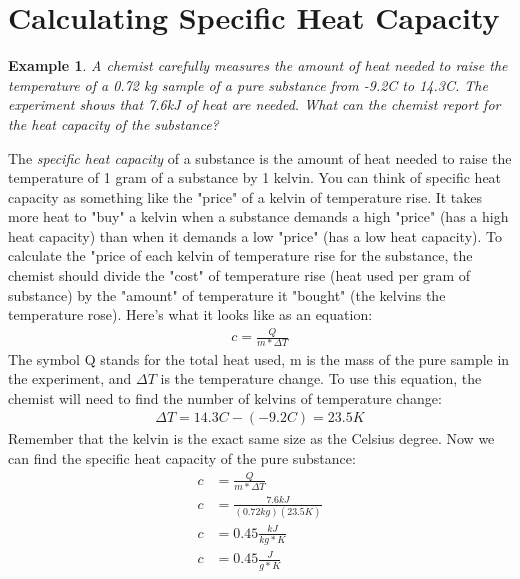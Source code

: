 \documentclass{article}  %
\newtheorem{exmp}{Example}
\begin{document}
\section*{Calculating Specific Heat Capacity}
\begin{exmp}
    A chemist carefully measures the amount of heat needed to raise the temperature of a 0.72 kg sample of a pure substance from -9.2C to 14.3C. The experiment shows that 7.6kJ of heat are needed. What can the chemist report for the heat capacity of the substance? 
\end{exmp}
The \emph{specific heat capacity} of a substance is the amount of heat needed to raise the temperature of 1 gram of a substance by 1 kelvin. You can think of specific heat capacity as something like the "price" of a kelvin of temperature rise. It takes more heat to "buy" a kelvin when a substance demands a high "price" (has a high heat capacity) than when it demands a low "price" (has a low heat capacity).
\newline
To calculate the "price of each kelvin of temperature rise for the substance, the chemist should divide the "cost" of temperature rise (heat used per gram of substance) by the "amount" of temperature it "bought" (the kelvins the temperature rose). Here's what it looks like as an equation:
\begin{equation*}
    \begin{aligned}
        c = \frac{Q}{m*\Delta T}
    \end{aligned}
\end{equation*}
The symbol Q stands for the total heat used, m is the mass of the pure sample in the experiment, and $\Delta T$ is the temperature change.
To use this equation, the chemist will need to find the number of kelvins of temperature change:
\begin{equation*}
    \begin{aligned}
        \Delta T = 14.3C - (-9.2C) = 23.5K
    \end{aligned}
\end{equation*}
Remember that the kelvin is the exact same size as the Celsius degree. Now we can find the specific heat capacity of the pure substance:
\begin{equation*}
    \begin{aligned}
        c &= \frac{Q}{m*\Delta T} \\
        c &= \frac{7.6kJ}{(0.72kg)(23.5K)} \\
        c &= 0.45 \frac{kJ}{kg*K} \\
        c &= 0.45 \frac{J}{g*K} \\
    \end{aligned}
\end{equation*}
\end{document}
